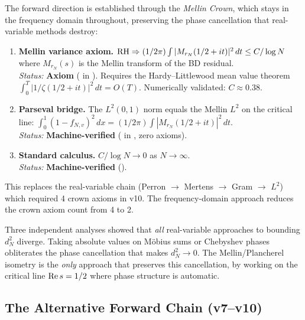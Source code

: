 \documentclass[11pt,a4paper]{article}
\begin{document}
The forward direction is established through the \emph{Mellin Crown},
which stays in the frequency domain throughout, preserving the phase
cancellation that real-variable methods destroy:

\begin{enumerate}
  \item \textbf{Mellin variance axiom.} $\mathrm{RH} \Rightarrow
    (1/2\pi)\int|M_{r_N}(1/2+it)|^2\,dt \leq C/\log N$
    where $M_{r_N}(s)$ is the Mellin transform of the BD residual. \\
    \emph{Status:} \textbf{Axiom} (
    in ). Requires the Hardy--Littlewood
    mean value theorem $\int_0^T|1/\zeta(1/2+it)|^2\,dt = O(T)$.
    Numerically validated: $C \approx 0.38$.

  \item \textbf{Parseval bridge.} The $L^2(0,1)$ norm equals the
    Mellin $L^2$ on the critical line:
    $\int_0^1(1-f_{N,v})^2\,dx = (1/2\pi)\int|M_{r_N}(1/2+it)|^2\,dt$. \\
    \emph{Status:} \textbf{Machine-verified} (
    in , zero axioms).

  \item \textbf{Standard calculus.} $C/\log N \to 0$ as $N \to \infty$. \\
    \emph{Status:} \textbf{Machine-verified} ().
\end{enumerate}

This replaces the real-variable chain (Perron $\to$ Mertens $\to$ Gram $\to$ $L^2$)
which required 4 crown axioms in v10. The frequency-domain approach
reduces the crown axiom count from 4 to 2.

\begin{remark}
Three independent analyses showed that \emph{all} real-variable approaches
to bounding $d_N^2$ diverge. Taking absolute values on M\"obius sums or
Chebyshev phases obliterates the phase cancellation that makes $d_N^2 \to 0$.
The Mellin/Plancherel isometry is the \emph{only} approach that preserves
this cancellation, by working on the critical line $\operatorname{Re} s = 1/2$ where
phase structure is automatic.
\end{remark}

\subsection{The Alternative Forward Chain (v7--v10)}
\end{document}
